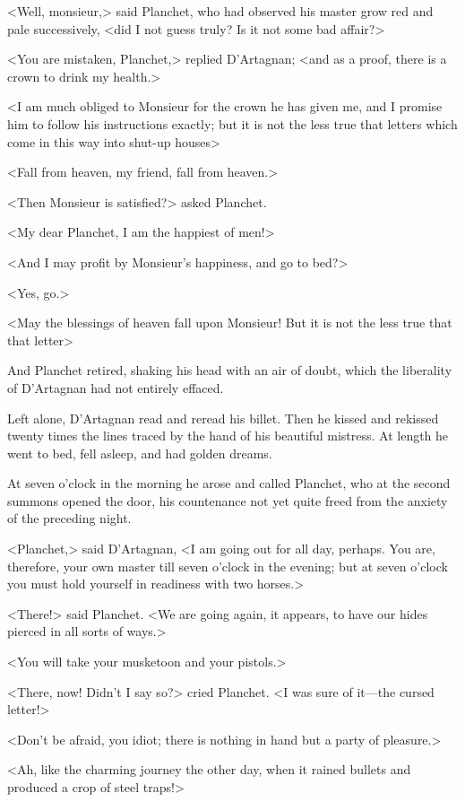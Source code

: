 <Well, monsieur,> said Planchet, who had observed his master grow red and pale successively, <did I not guess truly? Is it not some bad affair?> 

<You are mistaken, Planchet,> replied D'Artagnan; <and as a proof, there is a crown to drink my health.> 

<I am much obliged to Monsieur for the crown he has given me, and I promise him to follow his instructions exactly; but it is not the less true that letters which come in this way into shut-up houses\longdash> 

<Fall from heaven, my friend, fall from heaven.> 

<Then Monsieur is satisfied?> asked Planchet. 

<My dear Planchet, I am the happiest of men!> 

<And I may profit by Monsieur's happiness, and go to bed?> 

<Yes, go.> 

<May the blessings of heaven fall upon Monsieur! But it is not the less true that that letter\longdash> 

And Planchet retired, shaking his head with an air of doubt, which the liberality of D'Artagnan had not entirely effaced. 

Left alone, D'Artagnan read and reread his billet. Then he kissed and rekissed twenty times the lines traced by the hand of his beautiful mistress. At length he went to bed, fell asleep, and had golden dreams. 

At seven o'clock in the morning he arose and called Planchet, who at the second summons opened the door, his countenance not yet quite freed from the anxiety of the preceding night. 

<Planchet,> said D'Artagnan, <I am going out for all day, perhaps. You are, therefore, your own master till seven o'clock in the evening; but at seven o'clock you must hold yourself in readiness with two horses.> 

<There!> said Planchet. <We are going again, it appears, to have our hides pierced in all sorts of ways.> 

<You will take your musketoon and your pistols.> 

<There, now! Didn't I say so?> cried Planchet. <I was sure of it—the cursed letter!> 

<Don't be afraid, you idiot; there is nothing in hand but a party of pleasure.> 

<Ah, like the charming journey the other day, when it rained bullets and produced a crop of steel traps!> 

